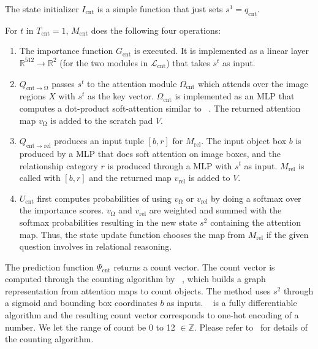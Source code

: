 \documentclass{article}
\def\Mrel{M_\mathrm{rel}}
\begin{document}
The state initializer $I_\mathrm{cnt}$ is a simple function that just sets $s^1 = q_\mathrm{cnt}$.

For $t$ in $T_{\mathrm{cnt}}=1$, $M_\mathrm{cnt}$ does the following four operations:

\begin{enumerate}[\hspace{0pt}(1)]
\item{
The importance function $G_\mathrm{cnt}$ is executed. It is implemented as a linear layer $\mathbb{R}^{512} \to \mathbb{R}^2$ (for the two modules in $\mathcal L_\mathrm{cnt}$) that takes $s^t$ as input.
} 

\item{
$Q_{\mathrm{cnt}\rightarrow \mathrm{\Omega}}$ passes $s^t$ to the attention module $\Omega_\mathrm{cnt}$ which attends over the image regions $X$ with $s^t$ as the key vector.
$\Omega_\mathrm{cnt}$ is implemented as an MLP that computes a dot-product soft-attention similar to ~\citet{yang16san}. The returned attention map $v_\mathrm{\Omega}$ is added to the scratch pad $V$.
} 

\item{
$Q_{\mathrm{cnt}\rightarrow \mathrm{rel}}$ produces an input tuple $[b, r]$ for $\Mrel$.
The input object box $b$ is produced by a MLP that does soft attention on image boxes, and the relationship category $r$ is produced through a MLP with $s^t$ as input.
$\Mrel$ is called with $[b, r]$ and the returned map $v_\mathrm{rel}$ is added to $V$.
} 

\item{
$U_\mathrm{cnt}$ first computes probabilities of using $v_\mathrm{\Omega}$ or $v_\mathrm{rel}$ by doing a softmax over the importance scores.
$v_\mathrm{\Omega}$ and $v_\mathrm{rel}$ are weighted and summed with the softmax probabilities resulting in the new state $s^2$ containing the attention map.
Thus, the state update function chooses the map from $\Mrel$ if the given question involves in relational reasoning.
} 

\end{enumerate}

The prediction function $\Psi_\mathrm{cnt}$ returns a count vector.
The count vector is computed through the counting algorithm by ~\citet{zhang18}, which builds a graph representation from attention maps to count objects.
The method uses $s^2$ through a sigmoid and bounding box coordinates $b$ as inputs.
~\citet{zhang18} is a fully differentiable algorithm and the resulting count vector corresponds to one-hot encoding of a number.
We let the range of count be 0 to 12 $\in \mathbb{Z}$.
Please refer to~\citet{zhang18} for details of the counting algorithm.
\end{document}
